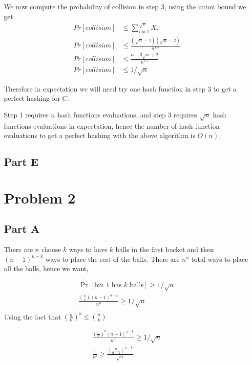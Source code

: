 \documentclass[a4paper]{article}
\begin{document}
We now compute the probability of collision in step 3,
using the union bound we get
\begin{align*}
	Pr[collision] &\leq \sum_{i=1}^{\sqrt{n}} X_i\\
	Pr[collision] &\leq  \frac{(\sqrt{n}-1)(\sqrt{n}-2)}{n^{1.5}}\\
	Pr[collision] &\leq \frac{n - 3\sqrt{n} + 2}{n^{1.5}}\\
	Pr[collision] &\leq 1/\sqrt{n}
\end{align*}

Therefore in expectation we will need try one hash function in step 3 to get a perfect hashing for $C$.

Step 1 requires $n$ hash functions evaluations, and step 3 requires $\sqrt{n}$ hash functions evaluations in expectation, hence the 
number of hash function evaluations to get a perfect hashing with the above algorithm is 
$O(n)$.





\subsection{Part E}

\section{Problem 2}
\subsection{Part A}

There are $n$ choose $k$ ways to have $k$ balls in the first bucket and then $(n-1)^{n-k}$ ways to place the rest of the balls. There are $n^n$ total 
ways to place all the balls, hence we want,

\begin{align*}
	\Pr[\text{bin 1 has $k$ balls}] \geq 1/\sqrt{n}\\
	\frac{{n \choose k}(n-1)^{n-k}}{n^n} \geq 1/\sqrt{n}\\
\end{align*}
Using the fact that $(\frac{n}{k})^ k \leq {n \choose k}$

\begin{align*}
	\frac{(\frac{n}{k})^k(n-1)^{n-k}}{n^n} \geq 1/\sqrt{n}\\
	\frac{1}{k^k} \geq \frac{(\frac{n}{n-1})^{n-k}}{\sqrt n}\\
\end{align*}
\end{document}
